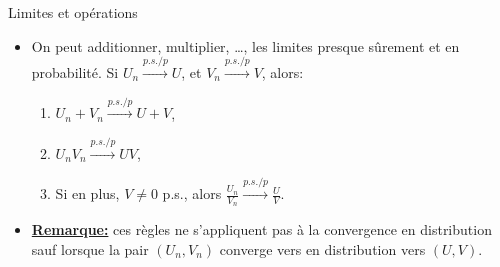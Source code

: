         \begin{frame}
            [allowframebreaks]{Limites et opérations}\begin{itemize}
                \item On peut additionner, multiplier, \ldots, les limites presque sûrement et en probabilité.
                Si $U_n \overset{p.s./p}{\longrightarrow} U$, et $V_n \overset{p.s./p}{\longrightarrow} V$, alors: 
                \begin{enumerate}[-]
                    \item $U_n + V_n \overset{p.s./p}{\longrightarrow} U+V$,
                    \item $U_nV_n \overset{p.s./p}{\longrightarrow} UV$,
                    \item Si en plus, $V\neq 0$ p.s., alors $\frac{U_n}{V_n}\overset{p.s./p}{\longrightarrow}\frac{U}{V}$.
                \end{enumerate}
                \item \textbf{\underline{Remarque:}} ces règles ne s'appliquent pas à la convergence en distribution sauf lorsque la pair $(U_n, V_n)$ 
                converge vers en distribution vers $(U, V)$.
            \end{itemize}
                 
        \end{frame}
